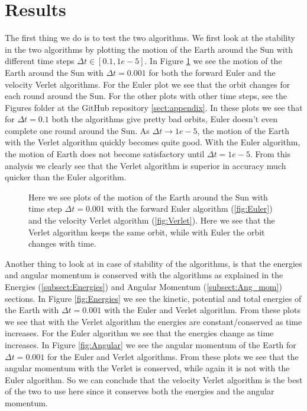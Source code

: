\documentclass[12pt,a4paper,english]{article}
\begin{document}
\section{Results}
\label{sect:Results}
The first thing we do is to test the two algorithms. We first look at the stability in the two algorithms by plotting the motion of the Earth around the Sun with different time steps $\Delta t\in[0.1,1e-5]$. In Figure \ref{fig:EulerVsVerlet} we see the motion of the Earth around the Sun with $\Delta t=0.001$ for both the forward Euler and the velocity Verlet algorithms. For the Euler plot we see that the orbit changes for each round around the Sun. For the other plots with other time steps, see the Figures folder at the GitHub repository \ref{sect:appendix}. In these plots we see that for $\Delta t=0.1$ both the algorithms give pretty bad orbits, Euler doesn't even complete one round around the Sun. As $\Delta t\rightarrow 1e-5$, the motion of the Earth with the Verlet algorithm quickly becomes quite good. With the Euler algorithm, the motion of Earth does not become satisfactory until $\Delta t=1e-5$. From this analysis we clearly see that the Verlet algorithm is superior in accuracy much quicker than the Euler algorithm.

\begin{figure}[htbp]
	\hspace{0.5em}
	\caption{Here we see plots of the motion of the Earth around the Sun with time step $\Delta t=0.001$ with the forward Euler algorithm (\ref{fig:Euler}) and the velocity Verlet algorithm (\ref{fig:Verlet}). Here we see that the Verlet algorithm keeps the same orbit, while with Euler the orbit changes with time.\label{fig:EulerVsVerlet}}
\end{figure}

Another thing to look at in case of stability of the algorithms, is that the energies and angular momentum is conserved with the algorithms as explained in the Energies (\ref{subsect:Energies}) and Angular Momentum (\ref{subsect:Ang_mom}) sections. In Figure \ref{fig:Energies} we see the kinetic, potential and total energies of the Earth with $\Delta t=0.001$ with the Euler and Verlet algorithm. From these plots we see that with the Verlet algorithm the energies are constant/conserved as time increases. For the Euler algorithm we see that the energies change as time increases. In Figure \ref{fig:Angular} we see the angular momentum of the Earth for $\Delta t=0.001$ for the Euler and Verlet algorithms. From these plots we see that the angular momentum with the Verlet is conserved, while again it is not with the Euler algorithm. So we can conclude that the velocity Verlet algorithm is the best of the two to use here since it conserves both the energies and the angular momentum.
\end{document}
